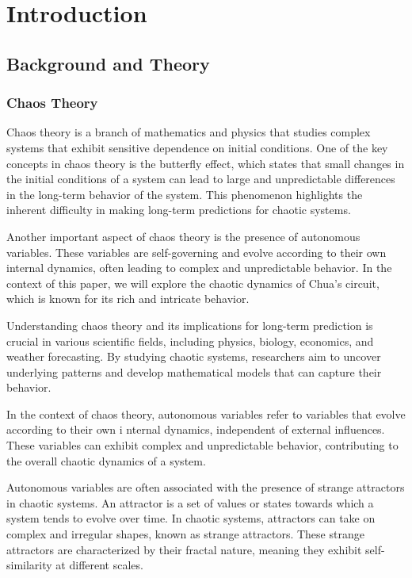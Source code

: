 \documentclass[12pt]{article}
\begin{document}
\section{Introduction}
        \subsection{Background and Theory}

                \subsubsection{Chaos Theory} 
                Chaos theory is a branch of mathematics and physics that studies complex systems that exhibit 
                sensitive dependence on initial conditions. One of the key concepts in chaos theory is the butterfly
                 effect, which states that small changes in the initial conditions of a system can lead to large and 
                 unpredictable differences in the long-term behavior of the system. This phenomenon highlights the inherent 
                 difficulty in making long-term predictions for chaotic systems.

                Another important aspect of chaos theory is the presence of autonomous variables. These variables are 
                self-governing and evolve according to their own internal dynamics, often leading to complex and unpredictable 
                behavior. In the context of this paper, we will explore the chaotic dynamics of Chua's circuit, which is known 
                for its rich and intricate behavior.

                Understanding chaos theory and its implications for long-term prediction is crucial in various scientific 
                fields, including physics, biology, economics, and weather forecasting. By studying chaotic systems, 
                researchers aim to uncover underlying patterns and develop mathematical models that can capture their behavior.

                In the context of chaos theory, autonomous variables refer to variables that evolve according to their own i
                nternal dynamics, independent of external influences. These variables can exhibit complex and unpredictable 
                behavior, contributing to the overall chaotic dynamics of a system.

                Autonomous variables are often associated with the presence of strange attractors in chaotic systems. 
                An attractor is a set of values or states towards which a system tends to evolve over time. In chaotic 
                systems, attractors can take on complex and irregular shapes, known as strange attractors. These strange 
                attractors are characterized by their fractal nature, meaning they exhibit self-similarity at different scales.
\end{document}
